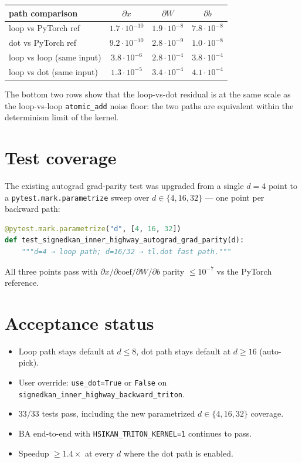 \documentclass[11pt,a4paper]{article}
\begin{document}
\begin{center}\small
\begin{tabular}{l c c c}
\toprule
\textbf{path comparison} & \textbf{$\partial x$} & \textbf{$\partial W$} & \textbf{$\partial b$} \\
\midrule
loop vs PyTorch ref       & $1.7\!\cdot\!10^{-10}$ & $1.9\!\cdot\!10^{-8}$  & $7.8\!\cdot\!10^{-8}$  \\
dot  vs PyTorch ref       & $9.2\!\cdot\!10^{-10}$ & $2.8\!\cdot\!10^{-9}$  & $1.0\!\cdot\!10^{-8}$  \\
loop vs loop (same input) & $3.8\!\cdot\!10^{-6}$  & $2.8\!\cdot\!10^{-4}$  & $3.8\!\cdot\!10^{-4}$  \\
loop vs dot  (same input) & $1.3\!\cdot\!10^{-5}$  & $3.4\!\cdot\!10^{-4}$  & $4.1\!\cdot\!10^{-4}$  \\
\bottomrule
\end{tabular}
\end{center}

The bottom two rows show that the loop-vs-dot residual is at the
same scale as the loop-vs-loop \texttt{atomic\_add} noise floor: the
two paths are equivalent within the determinism limit of the kernel.

\section{Test coverage}

The existing autograd grad-parity test was upgraded from a single
$d = 4$ point to a \texttt{pytest.mark.parametrize} sweep over
$d \in \{4, 16, 32\}$ --- one point per backward path:

\begin{lstlisting}[language=Python]
@pytest.mark.parametrize("d", [4, 16, 32])
def test_signedkan_inner_highway_autograd_grad_parity(d):
    """d=4 → loop path; d=16/32 → tl.dot fast path."""
\end{lstlisting}

All three points pass with $\partial x / \partial \mathrm{coef} /
\partial W / \partial b$ parity $\le 10^{-7}$ vs the PyTorch reference.

\section{Acceptance status}

\begin{itemize}[leftmargin=*]
  \item[$\checkmark$] Loop path stays default at $d \le 8$, dot path stays default at $d \ge 16$ (auto-pick).
  \item[$\checkmark$] User override: \texttt{use\_dot=True} or \texttt{False} on \texttt{signedkan\_inner\_highway\_backward\_triton}.
  \item[$\checkmark$] $33 / 33$ tests pass, including the new parametrized $d \in \{4, 16, 32\}$ coverage.
  \item[$\checkmark$] BA end-to-end with \texttt{HSIKAN\_TRITON\_KERNEL=1} continues to pass.
  \item[$\checkmark$] Speedup $\ge 1.4\times$ at every $d$ where the dot path is enabled.
\end{itemize}
\end{document}
